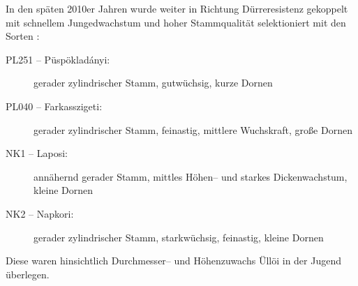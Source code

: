 \documentclass[twocolumn]{scrartcl}
\begin{document}
In den späten 2010er Jahren wurde weiter in Richtung Dürreresistenz
gekoppelt mit schnellem Jungedwachstum und hoher Stammqualität
selektioniert mit den Sorten \citep{abri2023robinieUngarn,abri2024dis}:
\begin{description}
  \item[PL251 -- Püspökladányi:] gerader zylindrischer Stamm, gutwüchsig, kurze Dornen
  \item[PL040 -- Farkasszigeti:] gerader zylindrischer Stamm, feinastig, mittlere Wuchskraft, große Dornen
  \item[NK1 -- Laposi:] annähernd gerader Stamm, mittles Höhen-- und starkes Dickenwachstum, kleine Dornen
  \item[NK2 -- Napkori:] gerader zylindrischer Stamm, starkwüchsig,
feinastig, kleine Dornen
\end{description}
Diese waren hinsichtlich Durchmesser-- und Höhenzuwachs Üllöi in der
Jugend überlegen.
\end{document}
